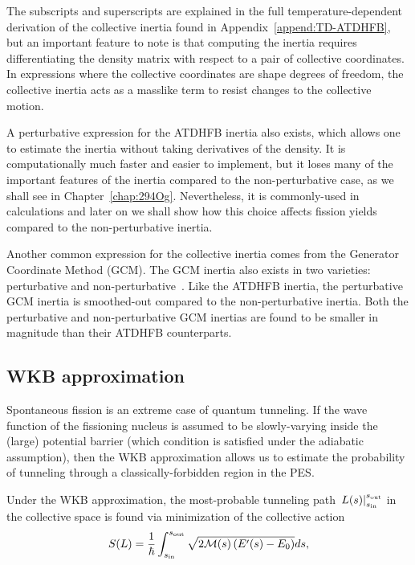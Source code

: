 \noindent The subscripts and superscripts are explained in the full temperature-dependent derivation of the collective inertia found in Appendix~\ref{append:TD-ATDHFB}, but an important feature to note is that computing the inertia requires differentiating the density matrix with respect to a pair of collective coordinates. In expressions where the collective coordinates are shape degrees of freedom, the collective inertia acts as a masslike term to resist changes to the collective motion.

A perturbative expression for the ATDHFB inertia also exists, which allows one to estimate the inertia without taking derivatives of the density. It is computationally much faster and easier to implement, but it loses many of the important features of the inertia compared to the non-perturbative case, as we shall see in Chapter~\ref{chap:294Og}. Nevertheless, it is commonly-used in calculations and later on we shall show how this choice affects fission yields compared to the non-perturbative inertia.

Another common expression for the collective inertia comes from the Generator Coordinate Method (GCM). The GCM inertia also exists in two varieties: perturbative and non-perturbative~\cite{giuliani2018b}. Like the ATDHFB inertia, the perturbative GCM inertia is smoothed-out compared to the non-perturbative inertia. Both the perturbative and non-perturbative GCM inertias are found to be smaller in magnitude than their ATDHFB counterparts.

\subsection{WKB approximation}\label{sect:wkb}
Spontaneous fission is an extreme case of quantum tunneling. If the wave function of the fissioning nucleus is assumed to be slowly-varying inside the (large) potential barrier (which condition is satisfied under the adiabatic assumption), then the WKB approximation allows us to estimate the probability of tunneling through a classically-forbidden region in the PES.

Under the WKB approximation, the most-probable tunneling path $\left. L(s) \right|_{s_{\rm in}}^{s_{\rm out}}$ in the collective space is found via minimization of the collective action
\begin{equation}\label{eq:action} 
S(L) = \frac{1}{\hbar}\int_{s_{\rm in}}^{s_{\rm out}} \sqrt{2\mathcal{M}(s)\left(E'(s)-E_0\right)}ds,
\end{equation} 

